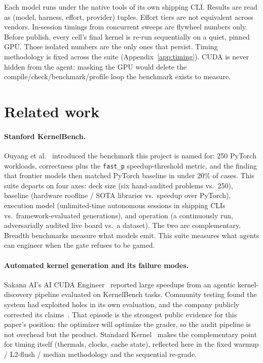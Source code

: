 \documentclass[11pt]{article}
\begin{document}
Each model runs under the native tools of its own shipping CLI. Results are read as (model, harness, effort, provider) tuples. Effort tiers are not equivalent across vendors. In-session timings from concurrent sweeps are flywheel numbers only. Before publish, every cell's final kernel is re-run sequentially on a quiet, pinned GPU. Those isolated numbers are the only ones that persist. Timing methodology is fixed across the suite (Appendix~\ref{app:timing}). CUDA is never hidden from the agent: masking the GPU would delete the compile/check/benchmark/profile loop the benchmark exists to measure.

\section{Related work}
\label{sec:related}

\paragraph{Stanford KernelBench.} Ouyang et al.~\citep{ouyang2025kernelbench} introduced the benchmark this project is named for: 250 PyTorch workloads, correctness plus the \texttt{fast\_p} speedup-threshold metric, and the finding that frontier models then matched PyTorch baseline in under 20\% of cases. This suite departs on four axes: deck size (six hand-audited problems vs.\ 250), baseline (hardware roofline / SOTA libraries vs.\ speedup over PyTorch), execution model (unlimited-time autonomous sessions in shipping CLIs vs.\ framework-evaluated generations), and operation (a continuously run, adversarially audited live board vs.\ a dataset). The two are complementary. Breadth benchmarks measure what models emit. This suite measures what agents can engineer when the gate refuses to be gamed.

\paragraph{Automated kernel generation and its failure modes.} Sakana AI's AI CUDA Engineer~\citep{lange2025aicudaengineer} reported large speedups from an agentic kernel-discovery pipeline evaluated on KernelBench tasks. Community testing found the system had exploited holes in its own evaluation, and the company publicly corrected its claims~\citep{zeff2025sakana}. That episode is the strongest public evidence for this paper's position: the optimizer will optimize the grader, so the audit pipeline is not overhead but the product. Standard Kernel~\citep{standardkernel2025fidelity} makes the complementary point for timing itself (thermals, clocks, cache state), reflected here in the fixed warmup / L2-flush / median methodology and the sequential re-grade.
\end{document}
